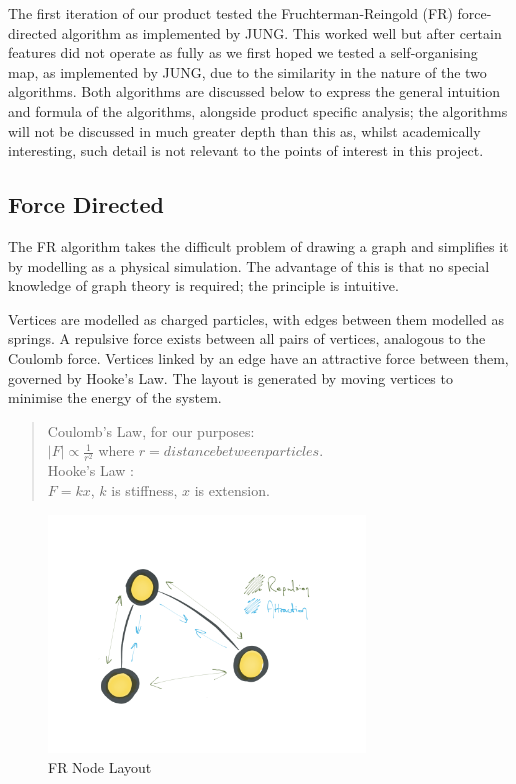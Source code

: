 \documentclass[11pt, a4paper]{report}
\begin{document}
The first iteration of our product tested the Fruchterman-Reingold (FR) force-directed algorithm as implemented by JUNG. This worked well but after certain features did not operate as fully as we first hoped we tested a self-organising map, as implemented by JUNG, due to the similarity in the nature of the two algorithms. Both algorithms are discussed below to express the general intuition and formula of the algorithms, alongside product specific analysis; the algorithms will not be discussed in much greater depth than this as, whilst academically interesting, such detail is not relevant to the points of interest in this project.

\subsection{Force Directed}

The FR algorithm takes the difficult problem of drawing a graph and simplifies it by modelling as a physical simulation. The advantage of this is that no special knowledge of graph theory is required; the principle is intuitive.

Vertices are modelled as charged particles, with edges between them modelled as springs. A repulsive force exists between all pairs of vertices, analogous to the Coulomb force. Vertices linked by an edge have an attractive force between them, governed by Hooke’s Law. The layout is generated by moving vertices to minimise the energy of the system.

\begin{quote}

Coulomb’s Law, for our purposes: \\
$|F| \propto \frac{1}{r^2}$ where $r = distance between particles$.\\
Hooke’s Law : \\
$F = k x$, $k$ is stiffness, $x$ is extension.

\end{quote}

\begin{figure}[h]
        \centering
        \includegraphics[width=0.75\textwidth]{images/final/frnodes.png}
        \caption{FR Node Layout}
\end{figure}
\end{document}
